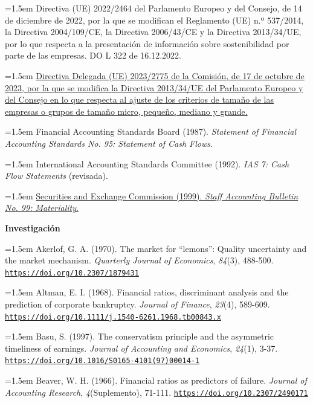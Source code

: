 \documentclass[10pt,a4paper]{article}
\begin{document}
\noindent\hangindent=1.5em Directiva (UE) 2022/2464 del Parlamento Europeo y del Consejo, de 14 de diciembre de 2022, por la que se modifican el Reglamento (UE) n.º 537/2014, la Directiva 2004/109/CE, la Directiva 2006/43/CE y la Directiva 2013/34/UE, por lo que respecta a la presentación de información sobre sostenibilidad por parte de las empresas. DO L 322 de 16.12.2022.

\noindent\hangindent=1.5em \href{https://www.boe.es/buscar/doc.php?id=DOUE-L-2023-81879}{Directiva Delegada (UE) 2023/2775 de la Comisión, de 17 de octubre de 2023, por la que se modifica la Directiva 2013/34/UE del Parlamento Europeo y del Consejo en lo que respecta al ajuste de los criterios de tamaño de las empresas o grupos de tamaño micro, pequeño, mediano y grande.}

\noindent\hangindent=1.5em Financial Accounting Standards Board (1987). \textit{Statement of Financial Accounting Standards No. 95: Statement of Cash Flows}.

\noindent\hangindent=1.5em International Accounting Standards Committee (1992). \textit{IAS 7: Cash Flow Statements} (revisada).

\noindent\hangindent=1.5em \href{https://www.sec.gov/interps/account/sab99.htm}{Securities and Exchange Commission (1999). \textit{Staff Accounting Bulletin No. 99: Materiality}.}

\textbf{Investigación}

\noindent\hangindent=1.5em Akerlof, G. A. (1970). The market for ``lemons'': Quality uncertainty and the market mechanism. \textit{Quarterly Journal of Economics}, \textit{84}(3), 488-500. \href{https://doi.org/10.2307/1879431}{\nolinkurl{https://doi.org/10.2307/1879431}}

\noindent\hangindent=1.5em Altman, E. I. (1968). Financial ratios, discriminant analysis and the prediction of corporate bankruptcy. \textit{Journal of Finance}, \textit{23}(4), 589-609. \href{https://doi.org/10.1111/j.1540-6261.1968.tb00843.x}{\nolinkurl{https://doi.org/10.1111/j.1540-6261.1968.tb00843.x}}

\noindent\hangindent=1.5em Basu, S. (1997). The conservatism principle and the asymmetric timeliness of earnings. \textit{Journal of Accounting and Economics}, \textit{24}(1), 3-37. \href{https://doi.org/10.1016/S0165-4101(97)00014-1}{\nolinkurl{https://doi.org/10.1016/S0165-4101(97)00014-1}}

\noindent\hangindent=1.5em Beaver, W. H. (1966). Financial ratios as predictors of failure. \textit{Journal of Accounting Research}, \textit{4}(Suplemento), 71-111. \href{https://doi.org/10.2307/2490171}{\nolinkurl{https://doi.org/10.2307/2490171}}
\end{document}
